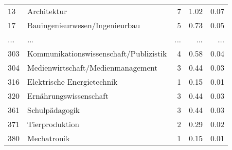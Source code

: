 \begin{longtable}{lXrrr}
        13 & \multicolumn{1}{X}{Architektur} & %
          \num{7} &
          \num[round-mode=places,round-precision=2]{1.02} &
          \num[round-mode=places,round-precision=2]{0.07} \\
        17 & \multicolumn{1}{X}{Bauingenieurwesen/Ingenieurbau} & %
          \num{5} &
          \num[round-mode=places,round-precision=2]{0.73} &
          \num[round-mode=places,round-precision=2]{0.05} \\
       ... & ... & ... & ... & ... \\
        303 & \multicolumn{1}{X}{Kommunikationswissenschaft/Publizistik} & %
          \num{4} &
          \num[round-mode=places,round-precision=2]{0.58} &
          \num[round-mode=places,round-precision=2]{0.04} \\

        304 & \multicolumn{1}{X}{Medienwirtschaft/Medienmanagement} & %
          \num{3} &
          \num[round-mode=places,round-precision=2]{0.44} &
          \num[round-mode=places,round-precision=2]{0.03} \\

        316 & \multicolumn{1}{X}{Elektrische Energietechnik} & %
          \num{1} &
          \num[round-mode=places,round-precision=2]{0.15} &
          \num[round-mode=places,round-precision=2]{0.01} \\

        320 & \multicolumn{1}{X}{Ernährungswissenschaft} & %
          \num{3} &
          \num[round-mode=places,round-precision=2]{0.44} &
          \num[round-mode=places,round-precision=2]{0.03} \\

        361 & \multicolumn{1}{X}{Schulpädagogik} & %
          \num{3} &
          \num[round-mode=places,round-precision=2]{0.44} &
          \num[round-mode=places,round-precision=2]{0.03} \\

        371 & \multicolumn{1}{X}{Tierproduktion} & %
          \num{2} &
          \num[round-mode=places,round-precision=2]{0.29} &
          \num[round-mode=places,round-precision=2]{0.02} \\

        380 & \multicolumn{1}{X}{Mechatronik} & %
          \num{1} &
          \num[round-mode=places,round-precision=2]{0.15} &
          \num[round-mode=places,round-precision=2]{0.01} \\


\end{longtable}
